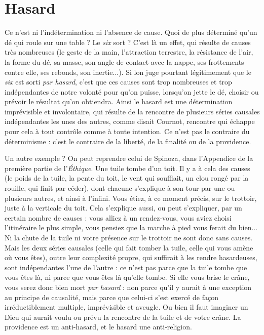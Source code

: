 
\section{Hasard}
Ce n’est ni l’indétermination ni l’absence de cause. Quoi de plus
déterminé qu’un dé qui roule sur une table ? Le {\it six} sort ? C’est là
un effet, qui résulte de causes très nombreuses (le geste de la main, l’attraction
terrestre, la résistance de l’air, la forme du dé, sa masse, son angle de contact
avec la nappe, ses frottements contre elle, ses rebonds, son inertie...). Si lon
juge pourtant légitimement que le {\it six} est sorti {\it par hasard}, c’est que ces causes
sont trop nombreuses et trop indépendantes de notre volonté pour qu’on
puisse, lorsqu’on jette le dé, choisir ou prévoir le résultat qu’on obtiendra. Ainsi
le hasard est une détermination imprévisible et involontaire, qui résulte de la
rencontre de plusieurs séries causales indépendantes les unes des autres, comme
disait Cournot, rencontre qui échappe pour cela à tout contrôle comme à toute
intention. Ce n’est pas le contraire du déterminisme : c’est le contraire de la
liberté, de la finalité ou de la providence.

Un autre exemple ? On peut reprendre celui de Spinoza, dans l’Appendice
de la première partie de l’{\it Éthique}. Une tuile tombe d’un toit. Il y a à cela des
causes (le poids de la tuile, la pente du toit, le vent qui soufflait, un clou rongé
par la rouille, qui finit par céder), dont chacune s’explique à son tour par une
ou plusieurs autres, et ainsi à l’infini. Vous étiez, à ce moment précis, sur le
trottoir, juste à la verticale du toit. Cela s'explique aussi, ou peut s'expliquer,
par un certain nombre de causes : vous alliez à un rendez-vous, vous aviez
choisi l'itinéraire le plus simple, vous pensiez que la marche à pied vous ferait
du bien... Ni la chute de la tuile ni votre présence sur le trottoir ne sont donc
sans causes. Mais les deux séries causales (celle qui fait tomber la tuile, celle qui
vous amène où vous êtes), outre leur complexité propre, qui suffirait à les
rendre hasardeuses, sont indépendantes l’une de l’autre : ce n’est pas parce que
la tuile tombe que vous êtes là, ni parce que vous êtes là qu’elle tombe. Si elle
vous brise le crâne, vous serez donc bien mort {\it par hasard} : non parce qu'il y
aurait à une exception au principe de causalité, mais parce que celui-ci s’est
exercé de façon irréductiblement multiple, imprévisible et aveugle. Ou bien il
faut imaginer un Dieu qui aurait voulu ou prévu la rencontre de la tuile et de
votre crâne. La providence est un anti-hasard, et le hasard une anti-religion.

